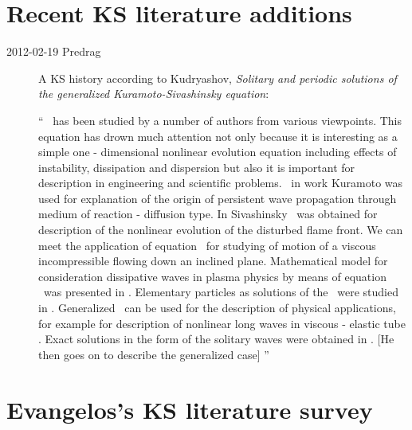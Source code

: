 
\section{Recent KS literature additions}
\label{sec:KSlitNew}

\begin{description}

\item[2012-02-19 Predrag]                               \toCB
A KS history according to Kudryashov,
\emph{Solitary and periodic solutions of the generalized {Kuramoto-Sivashinsky} equation}:

``
\KSe\ has been studied by a number of authors from various viewpoints.
This equation has drown much attention not only because it is interesting
as a simple one - dimensional nonlinear evolution equation including
effects of instability, dissipation and dispersion but also it is
important for description in engineering and scientific problems. \KSe\
in work Kuramoto was used for explanation of the origin of
persistent wave propagation through medium of reaction - diffusion type.
In Sivashinsky\rf{siv} \KSe\ was obtained for description of the
nonlinear evolution of the disturbed flame front. We can meet the
application of equation \KSe\  for studying of motion of a viscous
incompressible flowing down an inclined plane.
Mathematical model for consideration dissipative waves in plasma physics
by means of equation \KSe\  was presented in \refref{CoKrTeRo76}.
Elementary particles as solutions of the \KSe\ were studied in
. Generalized \KSe\ can be used for the description of
physical applications, for example for description of nonlinear long
waves in viscous - elastic tube \cite{Kudry08a}. Exact solutions in the
form of the solitary waves were obtained in \refref{ku,CoMu89}.
[He then goes on to describe the generalized case]
''

\end{description}


\section{Evangelos's KS literature survey}
\label{sec:KSlit}

